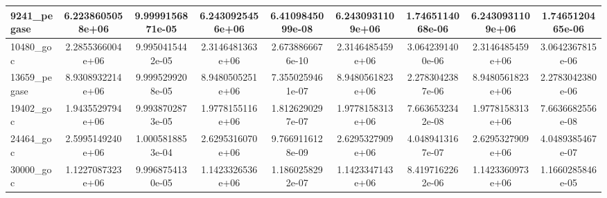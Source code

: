 \documentclass{standalone}
\begin{document}
\begin{tabular}{|l|cc|cc|cc|cc|}
9241\_pegase 
& 6.2238605058e+06
& 9.9999156871e-05
& 6.2430925456e+06
& 6.4109845099e-08
& 6.2430931109e+06
& 1.7465114068e-06
& 6.2430931109e+06
& 1.7465120465e-06
\\
\hline
10480\_goc 
& 2.2855366004e+06
& 9.9950415442e-05
& 2.3146481363e+06
& 2.6738866676e-10
& 2.3146485459e+06
& 3.0642391400e-06
& 2.3146485459e+06
& 3.0642367815e-06
\\

13659\_pegase 
& 8.9308932214e+06
& 9.9995299208e-05
& 8.9480505251e+06
& 7.3550259461e-07
& 8.9480561823e+06
& 2.2783042387e-06
& 8.9480561823e+06
& 2.2783042380e-06
\\

19402\_goc 
& 1.9435529794e+06
& 9.9938702873e-05
& 1.9778155116e+06
& 1.8126290297e-07
& 1.9778158313e+06
& 7.6636532342e-08
& 1.9778158313e+06
& 7.6636682556e-08
\\

24464\_goc 
& 2.5995149240e+06
& 1.0005818853e-04
& 2.6295316070e+06
& 9.7669116128e-09
& 2.6295327909e+06
& 4.0489413167e-07
& 2.6295327909e+06
& 4.0489385467e-07
\\

30000\_goc 
& 1.1227087323e+06
& 9.9968754130e-05
& 1.1423326536e+06
& 1.1860258292e-07
& 1.1423347143e+06
& 8.4197162262e-06
& 1.1423360973e+06
& 1.1660285846e-05

  \\
  \hline
\end{tabular}
\end{document}
